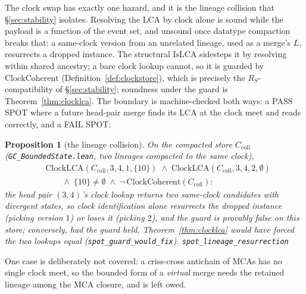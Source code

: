 \documentclass[11pt]{article}
\newtheorem{proposition}[theorem]{Proposition}
\newcommand{\lean}[1]{\texttt{#1}}
\begin{document}
The clock swap has exactly one hazard, and it is the lineage collision that
\S\ref{sec:stability} isolates. Resolving the LCA by clock alone is sound
while the payload is a function of the event set, and unsound once
datatype compaction breaks that: a same-clock version from an unrelated
lineage, used as a merge's $L$, resurrects a dropped instance. The
structural $\mathrm{IsLCA}$ sidesteps it by resolving within shared
ancestry; a bare clock lookup cannot, so it is guarded by
$\mathrm{ClockCoherent}$ (Definition~\ref{def:clockstore}), which is
precisely the $R_S$-compatibility of \S\ref{sec:stability}; soundness
under the guard is Theorem~\ref{thm:clocklca}. The boundary is
machine-checked both ways: a PASS SPOT where a future head-pair merge
finds its LCA at the clock meet and reads correctly, and a FAIL SPOT:

\begin{proposition}[the lineage collision]
\label{prop:lineage}
On the compacted store $C_{\mathrm{coll}}$
(\lean{GC\_BoundedState.lean}, two lineages compacted to the same
clock),
\[
\begin{aligned}
  &\mathrm{ClockLCA}(C_{\mathrm{coll}}, 3, 4, 1, \{10\})
  \;\wedge\; \mathrm{ClockLCA}(C_{\mathrm{coll}}, 3, 4, 2, \emptyset) \\
  &\qquad\wedge\; \{10\} \neq \emptyset
  \;\wedge\; \neg\, \mathrm{ClockCoherent}(C_{\mathrm{coll}}) :
\end{aligned}
\]
the head pair $(3,4)$'s clock lookup returns two same-clock candidates
with divergent states, so clock identification alone resurrects the
dropped instance (picking version $1$) or loses it (picking $2$), and
the guard is provably false on this store; conversely, had the guard
held, Theorem~\ref{thm:clocklca} would have forced the two lookups
equal (\lean{spot\_guard\_would\_fix}).
\hfill\lean{spot\_lineage\_resurrection}
\end{proposition}

One case
is deliberately not covered: a criss-cross antichain of MCAs has no
single clock meet, so the bounded form of a \emph{virtual} merge needs
the retained lineage among the MCA closure, and is left owed.
\end{document}
